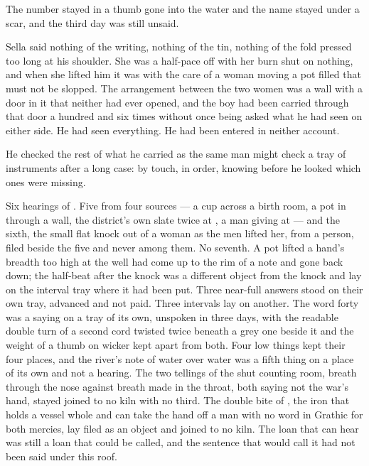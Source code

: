 The number stayed in a thumb gone into the water and the name stayed under a scar, and the third day was still unsaid.

Sella said nothing of the writing, nothing of the tin, nothing of the fold pressed too long at his shoulder. She was a half-pace off with her burn shut on nothing, and when she lifted him it was with the care of a woman moving a pot filled that must not be slopped. The arrangement between the two women was a wall with a door in it that neither had ever opened, and the boy had been carried through that door a hundred and six times without once being asked what he had seen on either side. He had seen everything. He had been entered in neither account.

\scenebreak

He checked the rest of what he carried as the same man might check a tray of instruments after a long case: by touch, in order, knowing before he looked which ones were missing.

Six hearings of . Five from four sources --- a cup across a birth room, a pot in  through a wall, the district's own slate twice at , a man giving at  --- and the sixth, the small flat knock out of a woman as the men lifted her, from a person, filed beside the five and never among them. No seventh. A pot lifted a hand's breadth too high at the well had come up to the rim of a note and gone back down; the half-beat after the knock was a different object from the knock and lay on the interval tray where it had been put. Three near-full answers stood on their own tray, advanced and not paid. Three intervals lay on another. The word forty was a saying on a tray of its own, unspoken in three days, with the readable double turn of a second cord twisted twice beneath a grey one beside it and the weight of a thumb on wicker kept apart from both. Four low things kept their four places, and the river's note of water over water was a fifth thing on a place of its own and not a hearing. The two tellings of the shut counting room, breath through the nose against breath made in the throat, both saying not the war's hand, stayed joined to no kiln with no third. The double bite of , the iron that holds a vessel whole and can take the hand off a man with no word in Grathic for both mercies, lay filed as an object and joined to no kiln. The loan that can hear was still a loan that could be called, and the sentence that would call it had not been said under this roof.

